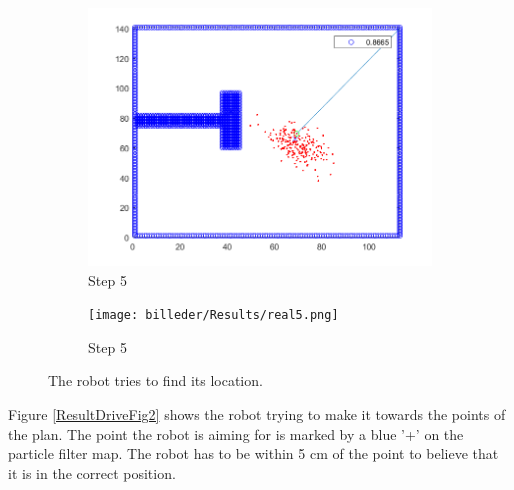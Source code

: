 \begin{figure}[H]
\begin{subfigure}{.5\textwidth}
  \centering
  \includegraphics[width=.8\linewidth]{billeder/Results/5.png}
  \caption{Step 5}
  \label{ResultDriveFig1:sub5}
\end{subfigure}%
\begin{subfigure}{.5\textwidth}
  \centering
  \texttt{[image: billeder/Results/real5.png]}
  \caption{Step 5}
  \label{ResultDriveFig1:sub6}
\end{subfigure}
\caption{The robot tries to find its location.}
\label{ResultDriveFig1}
\end{figure}
Figure \ref{ResultDriveFig2} shows the robot trying to make it towards the points of the plan. The point the robot is aiming for is marked by a blue '+' on the particle filter map. The robot has to be within  5 cm of the point to believe that it is in the correct position.
